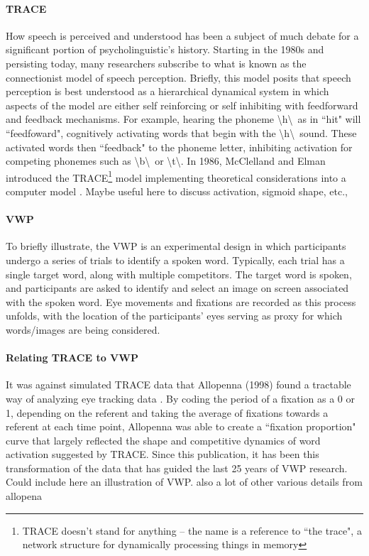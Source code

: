\documentclass{article}
\begin{document}
\paragraph{TRACE } How speech is perceived and understood has been a subject of much debate for a significant portion of psycholinguistic's history. Starting in the 1980s and persisting today, many researchers subscribe to what is known as the connectionist model of speech perception. Briefly, this model posits that speech perception is best understood as a hierarchical dynamical system in which aspects of the model are either self reinforcing or self inhibiting with feedforward and feedback mechanisms. For example, hearing the phoneme \textbackslash h\textbackslash  \ as in ``hit" will ``feedfoward", cognitively activating words that begin with the \textbackslash h\textbackslash \  sound. These activated words then ``feedback" to the phoneme letter, inhibiting activation for competing phonemes such as \textbackslash b\textbackslash \ or \textbackslash t\textbackslash. In 1986, McClelland and Elman introduced the TRACE\footnote{TRACE doesn't stand for anything -- the name is a reference to ``the trace", a network structure for dynamically processing things in memory} model implementing theoretical considerations into a computer model \cite{elman1985speech}. Maybe useful here to discuss activation, sigmoid shape, etc., 

\paragraph{VWP} To briefly illustrate, the VWP is an experimental design in which participants undergo a series of trials to identify a spoken word. Typically, each trial has a single target word, along with multiple competitors. The target word is spoken, and participants are asked to identify and select an image on screen associated with the spoken word. Eye movements and fixations are recorded as this process unfolds, with the location of the participants' eyes serving as proxy for which words/images are being considered. 

\paragraph{Relating TRACE to VWP} It was against simulated TRACE data that Allopenna (1998) found a tractable way of analyzing eye tracking data \cite{allopenna1998tracking}. By coding the period of a fixation as a 0 or 1, depending on the referent and taking the average of fixations towards a referent at each time point, Allopenna was able to create a ``fixation proportion" curve that largely reflected the shape and competitive dynamics of word activation suggested by TRACE. Since this publication, it has been this transformation of the data that has guided the last 25 years of VWP research. Could include here an illustration of VWP. also a lot of other various details from allopena
\end{document}
